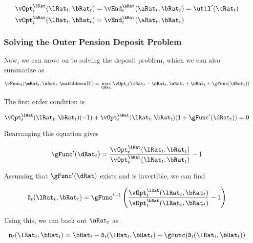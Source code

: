 \documentclass[\econtexRoot/SequentialEGM]{subfiles}
\begin{document}
\begin{equation}
  \begin{split}
    \vOpt_{t}^{\lRat}(\lRat_{t}, \bRat_{t}) & =
    \vEnd_{t}^{\aRat}(\aRat_{t}, \bRat_{t}) = \util'(\cRat_{t}) \\
    \vOpt_{t}^{\bRat}(\lRat_{t}, \bRat_{t}) & =
    \vEnd_{t}^{\bRat}(\aRat_{t}, \bRat_{t})
  \end{split}
\end{equation}

\subsubsection{Solving the Outer Pension Deposit Problem}

Now, we can move on to solving the deposit problem, which we can also summarize
as

\begin{equation}
  \vFunc_{t}(\mRat_{t}, \nRat_{t}, \Work) = \max_{\dRat_{t}}
  \vOpt_{t}(\mRat_{t}
  - \dRat_{t}, \nRat_{t} + \dRat_{t} + \gFunc(\dRat_{t}))
\end{equation}

The first order condition is

\begin{equation}
  \vOpt_{t}^{\lRat}(\lRat_{t}, \bRat_{t})(-1) +
  \vOpt_{t}^{\bRat}(\lRat_{t}, \bRat_{t})(1+\gFunc'(\dRat_{t})) = 0
\end{equation}

Rearranging this equation gives

\begin{equation}
  \gFunc'(\dRat_{t}) = \frac{\vOpt_{t}^{\lRat}(\lRat_{t},
    \bRat_{t})}{\vOpt_{t}^{\bRat}(\lRat_{t}, \bRat_{t})} - 1
\end{equation}

Assuming that $\gFunc'(\dRat)$ exists and is invertible, we can find

\providecommand{\dEndFunc}{\ensuremath{\mathfrak{d}}}

\begin{equation}
  \dEndFunc_{t}(\lRat_{t}, \bRat_{t}) = \gFunc'^{-1}\left(
  \frac{\vOpt_{t}^{\lRat}(\lRat_{t},
    \bRat_{t})}{\vOpt_{t}^{\bRat}(\lRat_{t},
    \bRat_{t})} - 1 \right)
\end{equation}

Using this, we can back out $\nRat_{t}$ as

\providecommand{\nEndFunc}{\ensuremath{\mathfrak{n}}}

\begin{equation}
  \nEndFunc_{t}(\lRat_{t}, \bRat_{t}) = \bRat_{t} -
  \dEndFunc_{t}(\lRat_{t}, \bRat_{t}) - \gFunc(\dEndFunc_{t}(\lRat_{t},
    \bRat_{t}))
\end{equation}
\end{document}
